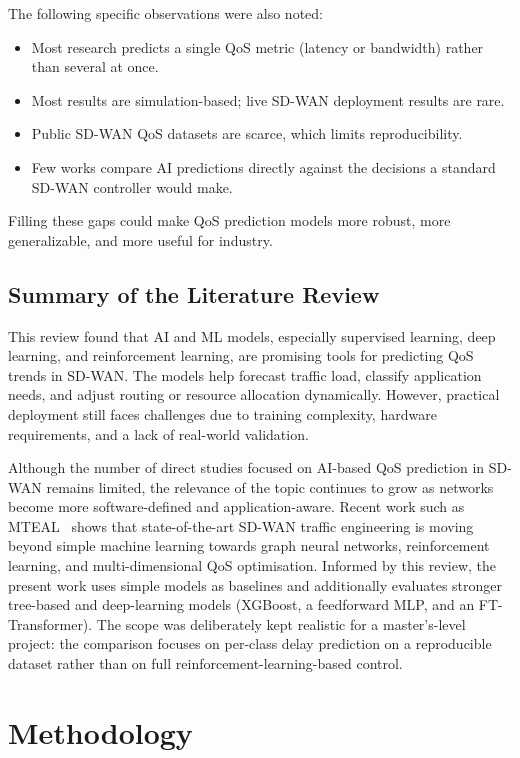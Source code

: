 \documentclass[a4paper,12pt]{Classes/RoboticsLaTeX}
\begin{document}
The following specific observations were also noted:
\begin{itemize}
    \item Most research predicts a single QoS metric (latency or bandwidth) rather than several at once.
    \item Most results are simulation-based; live SD-WAN deployment results are rare.
    \item Public SD-WAN QoS datasets are scarce, which limits reproducibility.
    \item Few works compare AI predictions directly against the decisions a standard SD-WAN controller would make.
\end{itemize}

Filling these gaps could make QoS prediction models more robust, more generalizable, and more useful for industry.

\section{Summary of the Literature Review}

This review found that AI and ML models, especially supervised learning, deep learning, and reinforcement learning, are promising tools for predicting QoS trends in SD-WAN. The models help forecast traffic load, classify application needs, and adjust routing or resource allocation dynamically. However, practical deployment still faces challenges due to training complexity, hardware requirements, and a lack of real-world validation.

Although the number of direct studies focused on AI-based QoS prediction in SD-WAN remains limited, the relevance of the topic continues to grow as networks become more software-defined and application-aware. Recent work such as MTEAL~\cite{chen2025mteal} shows that state-of-the-art SD-WAN traffic engineering is moving beyond simple machine learning towards graph neural networks, reinforcement learning, and multi-dimensional QoS optimisation. Informed by this review, the present work uses simple models as baselines and additionally evaluates stronger tree-based and deep-learning models (XGBoost, a feedforward MLP, and an FT-Transformer). The scope was deliberately kept realistic for a master's-level project: the comparison focuses on per-class delay prediction on a reproducible dataset rather than on full reinforcement-learning-based control.



\chapter{Methodology}
\label{chap:methodology}
\end{document}
